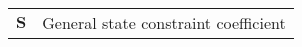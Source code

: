 \begin{scriptsize}
\begin{tabularx}{\textwidth}{r|X}
%
%
%
$\textbf{S}$              & General state constraint coefficient\\

\end{tabularx}
\end{scriptsize}
